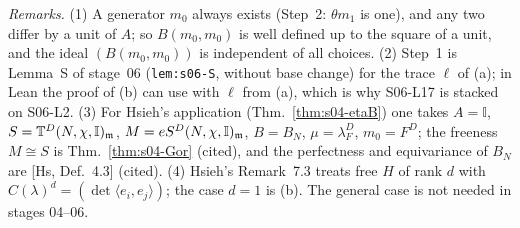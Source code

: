 \noindent\emph{Remarks.} (1) A generator $m_0$ always exists (Step~2: $\theta m_1$ is one), and any two differ by a unit of $A$; so
$B(m_0,m_0)$ is well defined up to the square of a unit, and the ideal $(B(m_0,m_0))$ is independent of all choices.
(2) Step~1 is Lemma~S of stage~06 (\texttt{lem:s06-S}, without base change) for the trace $\ell$ of (a); in Lean the proof of (b) can
use  with $\ell$ from (a), which is why S06-L17 is stacked on S06-L2.
(3) For Hsieh's application (Thm.~\ref{thm:s04-etaB}) one takes $A=\mathbb I$, $S=\mathbb{T}^D(N,\chi,\mathbb I)_{\mathfrak{m}}$,
$M=eS^D(N,\chi,\mathbb I)_{\mathfrak{m}}$, $B=B_N$, $\mu=\lambda^D_F$, $m_0=F^D$; the freeness $M\cong S$ is Thm.~\ref{thm:s04-Gor} (cited), and the
perfectness and equivariance of $B_N$ are [Hs, Def.~4.3] (cited).
(4) Hsieh's Remark~7.3 treats free $H$ of rank $d$ with $C(\lambda)^d=(\det\langle e_i,e_j\rangle)$; the case $d=1$ is (b). The
general case is not needed in stages 04--06.
